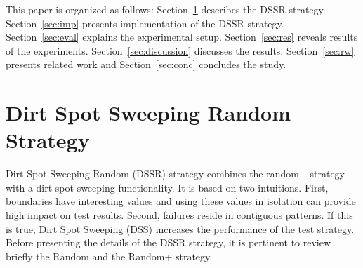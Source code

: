 \documentclass[conference]{IEEEtran}
\begin{document}

This paper is organized as follows: Section~\ref{sec:dssr} describes the DSSR strategy. Section~\ref{sec:imp} presents implementation of the DSSR strategy. Section~\ref{sec:eval} explains the experimental setup. Section~\ref{sec:res} reveals results of the experiments. Section~\ref{sec:discussion} discusses the results. Section~\ref{sec:rw} presents related work and Section~\ref{sec:conc} concludes the study.





\section{Dirt Spot Sweeping Random Strategy}\label{sec:dssr}
Dirt Spot Sweeping Random (DSSR) strategy combines the random+ strategy with a dirt spot sweeping functionality. It is based on two intuitions. First, boundaries have interesting values and using these values in isolation can provide high impact on test results. Second, failures reside in contiguous patterns. If this is true, Dirt Spot Sweeping (DSS) increases the performance of the test strategy. Before presenting the details of the DSSR strategy, it is pertinent to review briefly the Random and the Random+ strategy.
\end{document}

